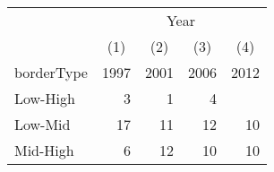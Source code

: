 \begin{center}
\begin{threeparttable}[!h]
\begin{tabular}{lrrrr}
\toprule
&\multicolumn{4}{c}{Year} \\
&\multicolumn{1}{c}{(1)}&\multicolumn{1}{c}{(2)}&\multicolumn{1}{c}{(3)}&\multicolumn{1}{c}{(4)}\\
borderType&\multicolumn{1}{c}{1997}&\multicolumn{1}{c}{2001}&\multicolumn{1}{c}{2006}&\multicolumn{1}{c}{2012}\\
\midrule
Low-High            &           3&           1&           4\\
Low-Mid             &          17&          11&          12&          10\\
Mid-High            &           6&          12&          10&          10\\
\bottomrule
\bottomrule
\end{tabular}
\end{threeparttable}
\end{center}
